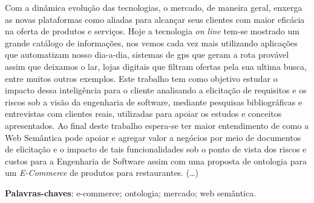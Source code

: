 \begin{resumo}

Com a dinâmica evolução das tecnologias, o mercado, de maneira geral,
 enxerga as novas plataformas como aliadas para alcançar seus clientes com maior
 eficácia na oferta de produtos e serviços. Hoje a tecnologia \textit{on line}
 tem-se mostrado um grande catálogo de informações, nos vemos cada vez
 mais utilizando aplicações que automatizam nosso dia-a-dia, sistemas de gps
 que geram a rota provável assim que deixamos o lar, lojas digitais que filtram
 ofertas pela sua ultima busca, entre muitos outros exemplos. Este trabalho tem
 como objetivo estudar o impacto dessa inteligência para o cliente
 analisando a elicitação de requisitos e os riscos sob a visão da engenharia de 
 software, mediante pesquisas  bibliográficas e entrevistas com clientes  reais, utilizadas para apoiar
 os estudos e conceitos apresentados. Ao final deste trabalho espera-se ter maior
 entendimento de como a Web Semântica pode apoiar e agregar valor a negócios 
 por meio de documentos de elicitação e o impacto de tais funcionalidades sob o ponto de vista
 dos riscos e custos para a Engenharia de Software assim com uma proposta de ontologia para
 um \textit{E-Commerce} de produtos para restaurantes. (\dots)

 \vspace{\onelineskip}
    
 \noindent
 \textbf{Palavras-chaves}: e-commerce; ontologia; mercado; web semântica.
\end{resumo}

